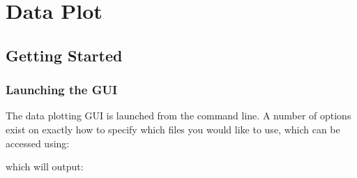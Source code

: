 \documentclass[letterpaper,10pt,english]{sphinxmanual}
\begin{document}
\section{Data Plot}
\label{\detokenize{index:data-plot}}

\subsection{Getting Started}
\label{\detokenize{content/data_plot/getting_started:getting-started}}\label{\detokenize{content/data_plot/getting_started::doc}}

\subsubsection{Launching the GUI}
\label{\detokenize{content/data_plot/getting_started:launching-the-gui}}
The data plotting GUI is launched from the command line. A number of options exist on exactly how to specify which files you would like to use, which can be accessed using:

\begin{sphinxVerbatim}[commandchars=\\\{\}]
 
\end{sphinxVerbatim}

which will output:

\begin{sphinxVerbatim}[commandchars=\\\{\}]
 
       
            
          
              
              
                 
\end{sphinxVerbatim}
\end{document}
